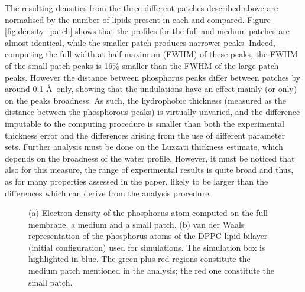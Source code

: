 The resulting densities from the three different patches described above are normalised by the number of lipids present in each and compared. Figure \ref{fig:density_patch} shows that the profiles for the full and medium patches are almost identical, while the smaller patch produces narrower peaks.
%
Indeed, computing the full width at half maximum (FWHM) of these peaks, the FWHM of the small patch peaks is 16\% smaller than the FWHM of the large patch peaks.
%
However the distance between phosphorus peaks differ between patches by around 0.1 \AA\ only, showing that the undulations have an effect mainly (or only) on the peaks broadness.
%
As such, the hydrophobic thickness (measured as the distance between the phosphorous peaks) is virtually unvaried, and the difference imputable to the computing procedure is smaller than both the experimental thickness error and the differences arising from the use of different parameter sets.
%
Further analysis must be done on the Luzzati thickness estimate, which depends on the broadness of the water profile. However, it must be noticed that also for this measure, the range of experimental results is quite broad and thus, as for many properties assessed in the paper, likely to be larger than the differences which can derive from the analysis procedure.

\begin{figure}[t!]
\centering
{}
%
\caption[Control computation on bilayer electron density calculation]{(a) Electron density of the phosphorus atom computed on the full membrane, a medium and a small patch. (b) van der Waals representation of the phosphorus atoms of the DPPC lipid bilayer (initial configuration) used for simulations. The simulation box is highlighted in blue. The green plus red regions constitute the medium patch mentioned in the analysis; the red one constitute the small patch.}
\label{fig:density_check}
\end{figure}

